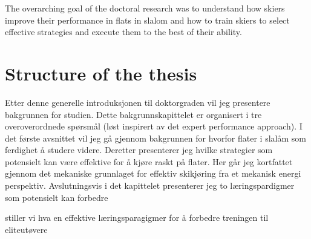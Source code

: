 The overarching goal of the doctoral research was to understand how skiers improve their performance in flats in slalom and how to train skiers to select effective strategies and execute them to the best of their ability.

\section{Structure of the thesis}
Etter denne generelle introduksjonen til doktorgraden vil jeg presentere bakgrunnen for studien. Dette bakgrunnskapittelet er organisert i tre overoverordnede spørsmål (løst inspirert av det expert performance approach). I det første avsnittet vil jeg gå gjennom bakgrunnen for hvorfor flater i slalåm som ferdighet å studere videre. Deretter presenterer jeg hvilke strategier som potensielt kan være effektive for å kjøre raskt på flater. Her går jeg kortfattet gjennom det mekaniske grunnlaget for effektiv skikjøring fra et mekanisk energi perspektiv. Avslutningsvis i det kapittelet presenterer jeg to læringspardigmer som potensielt kan forbedre 

stiller vi hva en effektive læringsparagigmer for å forbedre treningen til eliteutøvere




